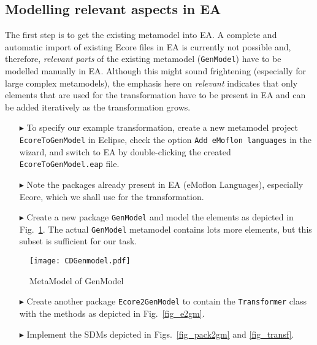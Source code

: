 \newpage

\subsection{Modelling relevant aspects in EA}
\visHeader

The first step is to get the existing metamodel into EA. A complete and automatic import of existing Ecore files in EA is currently not possible and, therefore,
\emph{relevant parts} of the existing metamodel (\texttt{GenModel}) have to be modelled manually in EA.
Although this might sound frightening (especially for large complex metamodels), the emphasis here on \emph{relevant} indicates that only elements that are used
for the transformation have to be present in EA and can be added iteratively as the transformation grows.

\begin{enumerate}
\item[$\blacktriangleright$] To specify our example transformation, create a new metamodel project \texttt{EcoreToGenModel} in Eclipse, check the option
\texttt{Add eMoflon languages} in the wizard, and switch to EA by double-clicking the created \texttt{Ecore\-To\-Gen\-Model.eap} file.

\item[$\blacktriangleright$] Note the packages already present in EA (eMoflon Languages), especially \textsf{Ecore}, which we shall use for the transformation.

\item[$\blacktriangleright$] Create a new package \texttt{GenModel} and model the elements as depicted in Fig.~\ref{fig_gMM}.
The actual \texttt{GenModel} metamodel contains lots more elements, but this subset is sufficient for our task.
\end{enumerate}

\begin{figure}[htbp]
\begin{center}  
	\texttt{[image: CDGenmodel.pdf]}
	\caption{MetaModel of GenModel}  
\label{fig_gMM}
\end{center}
\end{figure} 

\begin{enumerate}  
\item[$\blacktriangleright$] Create another package \texttt{Ecore2GenModel} to contain the \texttt{Transformer} class with the methods as depicted in
Fig.~\ref{fig_e2gm}.

\item[$\blacktriangleright$] Implement the SDMs depicted in Figs.~\ref{fig_pack2gm} and \ref{fig_transf}.
\end{enumerate}

